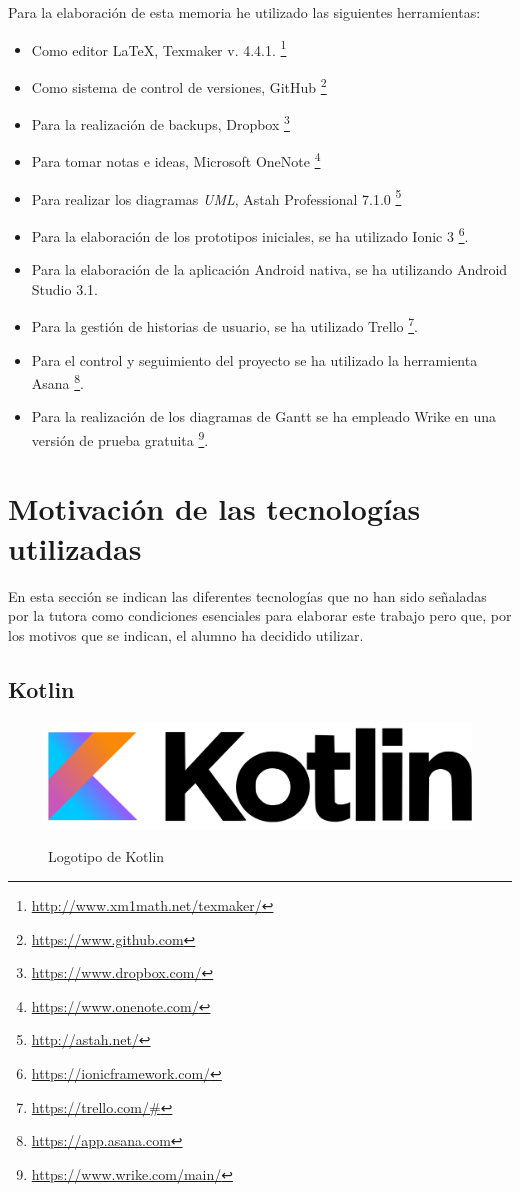 \documentclass[twoside]{report}
\begin{document}
Para la elaboración de esta memoria he utilizado las siguientes herramientas:
\begin{itemize}
\item Como editor \LaTeX , Texmaker v. 4.4.1. \footnote{\url{http://www.xm1math.net/texmaker/}}
\item Como sistema de control de versiones, GitHub \footnote{\url{https://www.github.com}}
\item Para la realización de backups, Dropbox \footnote{\url{https://www.dropbox.com/}}
\item Para tomar notas e ideas, Microsoft OneNote \footnote{\url{https://www.onenote.com/}}
\item Para realizar los diagramas \textit{UML}, Astah Professional 7.1.0  \footnote{\url{http://astah.net/}}
\item Para la elaboración de los prototipos iniciales, se ha utilizado Ionic 3 \footnote{\url{https://ionicframework.com/}}.
\item Para la elaboración de la aplicación Android nativa, se ha utilizando Android Studio 3.1.
\item Para la gestión de historias de usuario, se ha utilizado Trello \footnote{\url{https://trello.com/#}}.
\item Para el control y seguimiento del proyecto se ha utilizado la herramienta Asana \footnote{\url{https://app.asana.com}}.
\item Para la realización de los diagramas de Gantt se ha empleado Wrike en una versión de prueba gratuita \footnote{\url{https://www.wrike.com/main/}}.
\end{itemize}

\section{Motivación de las tecnologías utilizadas}
En esta sección se indican las diferentes tecnologías que no han sido señaladas por la tutora como condiciones esenciales para elaborar este trabajo pero que, por los motivos que se indican, el alumno ha decidido utilizar.

\subsection{Kotlin}

\begin{figure}[H]
\centering
\includegraphics[scale=0.3]{images/kotlin}\\
\caption{Logotipo de Kotlin} \cite{kotlin}
\end{figure}
\end{document}
